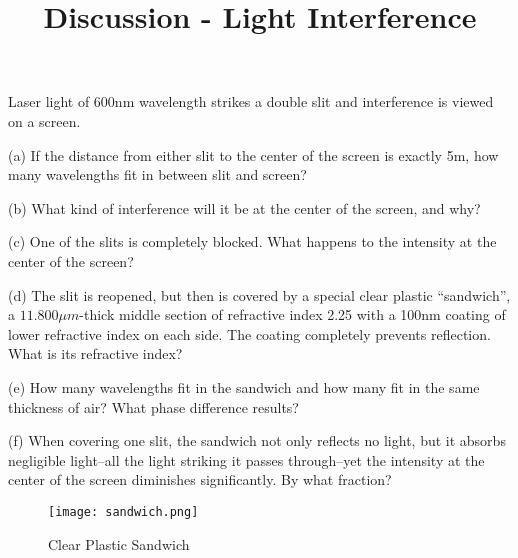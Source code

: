 \documentclass[10pt]{article}
\newenvironment{problem}[2][Problem]{\begin{trivlist}
\item[\hskip \labelsep {\bfseries #1}\hskip \labelsep {\bfseries #2.}]}{\end{trivlist}}
\begin{document}
 \title{Discussion - Light Interference}
\date{}
\maketitle

\begin{problem}{1}
Laser light of 600nm wavelength strikes a double slit and interference is viewed on a screen.
\item (a) If the distance from either slit to the center of the screen is exactly 5m, how many wavelengths fit in between slit and screen?
\item (b) What kind of interference will it be at the center of the screen, and why?
\item (c) One of the slits is completely blocked. What happens to the intensity at the center of the screen?
\item (d) The slit is reopened, but then is covered by a special clear plastic “sandwich”, a $11.800\mu m$-thick middle section of refractive index 2.25 with a 100nm coating of lower refractive index on each side. The coating completely prevents reflection. What is its refractive index?
\item (e) How many wavelengths fit in the sandwich and how many fit in the same
thickness of air? What phase difference results?
\item (f) When covering one slit, the sandwich not only reflects no light, but it absorbs negligible light--all the light striking it passes through--yet the intensity at the center of the screen diminishes significantly. By what fraction?
\end{problem}

\begin{figure}[htp]
    \centering
    \texttt{[image: sandwich.png]}
    \caption{Clear Plastic Sandwich}
    \label{fig:Graph of Wave}
\end{figure}






\end{document}
